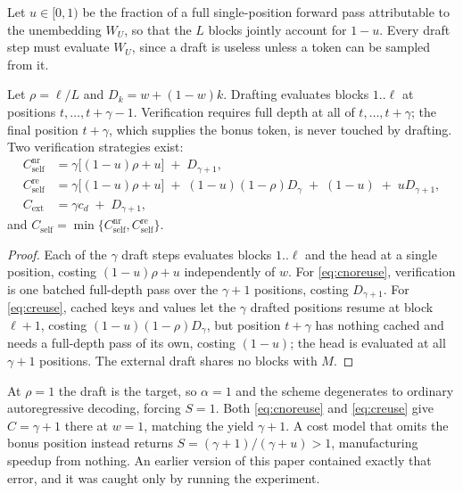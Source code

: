 \begin{definition}
\label{def:headfrac}
Let $u \in [0,1)$ be the fraction of a full single-position forward pass
attributable to the unembedding $W_U$, so that the $L$ blocks jointly account for
$1-u$. Every draft step must evaluate $W_U$, since a draft is useless unless a
token can be sampled from it.
\end{definition}

\begin{proposition}
\label{prop:cost}
Let $\rho = \ell/L$ and $D_k = w + (1-w)k$. Drafting evaluates blocks $1..\ell$
at positions $t,\dots,t+\gamma-1$. Verification requires full depth at all of
$t,\dots,t+\gamma$; the final position $t+\gamma$, which supplies the bonus
token, is never touched by drafting. Two verification strategies exist:
\begin{align}
  C^{\mathrm{nr}}_{\mathrm{self}}
    &= \gamma\big[(1-u)\rho + u\big] \;+\; D_{\gamma+1},
    \label{eq:cnoreuse}\\
  C^{\mathrm{re}}_{\mathrm{self}}
    &= \gamma\big[(1-u)\rho + u\big]
     \;+\; (1-u)(1-\rho)D_{\gamma} \;+\; (1-u) \;+\; u D_{\gamma+1},
    \label{eq:creuse}\\
  C_{\mathrm{ext}}
    &= \gamma c_d \;+\; D_{\gamma+1},
    \label{eq:cext}
\end{align}
and $C_{\mathrm{self}} = \min\{C^{\mathrm{nr}}_{\mathrm{self}},
C^{\mathrm{re}}_{\mathrm{self}}\}$.
\end{proposition}

\begin{proof}
Each of the $\gamma$ draft steps evaluates blocks $1..\ell$ and the head at a
single position, costing $(1-u)\rho + u$ independently of $w$. For
\eqref{eq:cnoreuse}, verification is one batched full-depth pass over the
$\gamma+1$ positions, costing $D_{\gamma+1}$. For \eqref{eq:creuse}, cached keys
and values let the $\gamma$ drafted positions resume at block $\ell+1$, costing
$(1-u)(1-\rho)D_\gamma$, but position $t+\gamma$ has nothing cached and needs a
full-depth pass of its own, costing $(1-u)$; the head is evaluated at all
$\gamma+1$ positions. The external draft shares no blocks with $M$.
\end{proof}

\begin{remark}
\label{rem:sanity}
At $\rho = 1$ the draft is the target, so $\alpha = 1$ and the scheme degenerates
to ordinary autoregressive decoding, forcing $S = 1$. Both \eqref{eq:cnoreuse}
and \eqref{eq:creuse} give $C = \gamma+1$ there at $w=1$, matching the yield
$\gamma+1$. A cost model that omits the bonus position instead returns
$S = (\gamma+1)/(\gamma+u) > 1$, manufacturing speedup from nothing. An earlier
version of this paper contained exactly that error, and it was caught only by
running the experiment.
\end{remark}

